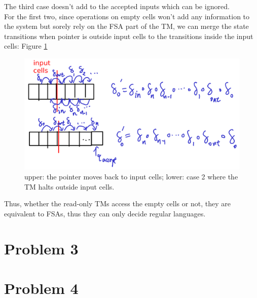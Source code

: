 \documentclass[twoside,11pt]{homework}
\begin{document}
\begin{solution}
  The third case doesn't add to the accepted inputs which can be ignored.\\
  For the first two, since operations on empty cells won't add any information to
  the system but sorely rely on the FSA part of the TM, we can merge the state
  transitions when pointer is outside input cells to the transitions inside the
  input cells: Figure \ref{fig:02}
  \begin{figure}[h]
  	\centering
  	\includegraphics[width=0.7\linewidth]{img/02.png}
  	\caption{upper: the pointer moves back to input cells; lower: case 2 where
      the TM halts outside input cells.}
  	\label{fig:02}
  \end{figure}

  Thus, whether the read-only TMs access the empty cells or not, they are
  equivalent to FSAs, thus they can only decide regular languages.

\end{solution}

\section*{Problem 3}
\section*{Problem 4}
\end{document}
